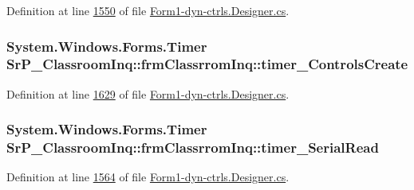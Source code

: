 \-Definition at line \hyperlink{_form1-dyn-ctrls_8_designer_8cs_source_l01550}{1550} of file \hyperlink{_form1-dyn-ctrls_8_designer_8cs_source}{\-Form1-\/dyn-\/ctrls.\-Designer.\-cs}.

\hypertarget{class_sr_p___classroom_inq_1_1frm_classrrom_inq_aa53f33f4a7245799242c52b4ceff8dab}{
\subsubsection[{timer\-\_\-\-Controls\-Create}]{\setlength{\rightskip}{0pt plus 5cm}\-System.\-Windows.\-Forms.\-Timer {\bf \-Sr\-P\-\_\-\-Classroom\-Inq\-::frm\-Classrrom\-Inq\-::timer\-\_\-\-Controls\-Create}}}
\label{class_sr_p___classroom_inq_1_1frm_classrrom_inq_aa53f33f4a7245799242c52b4ceff8dab}


\-Definition at line \hyperlink{_form1-dyn-ctrls_8_designer_8cs_source_l01629}{1629} of file \hyperlink{_form1-dyn-ctrls_8_designer_8cs_source}{\-Form1-\/dyn-\/ctrls.\-Designer.\-cs}.

\hypertarget{class_sr_p___classroom_inq_1_1frm_classrrom_inq_ae222e5fb7d4ed8ef65c9c3ff836cecf6}{
\subsubsection[{timer\-\_\-\-Serial\-Read}]{\setlength{\rightskip}{0pt plus 5cm}\-System.\-Windows.\-Forms.\-Timer {\bf \-Sr\-P\-\_\-\-Classroom\-Inq\-::frm\-Classrrom\-Inq\-::timer\-\_\-\-Serial\-Read}}}
\label{class_sr_p___classroom_inq_1_1frm_classrrom_inq_ae222e5fb7d4ed8ef65c9c3ff836cecf6}


\-Definition at line \hyperlink{_form1-dyn-ctrls_8_designer_8cs_source_l01564}{1564} of file \hyperlink{_form1-dyn-ctrls_8_designer_8cs_source}{\-Form1-\/dyn-\/ctrls.\-Designer.\-cs}.

